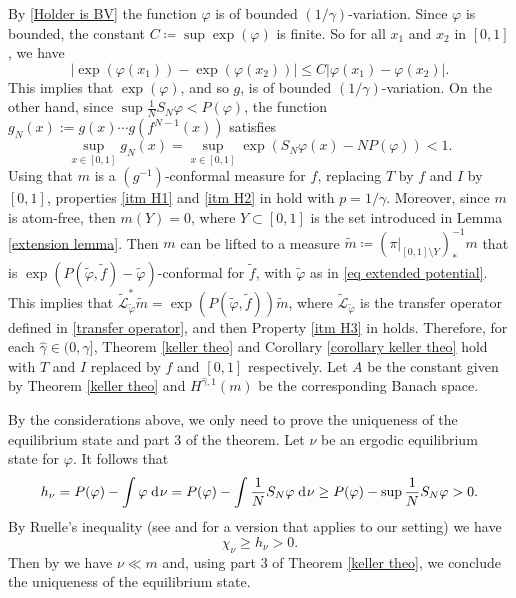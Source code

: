 \documentclass[12pt]{amsart}
\numberwithin{equation}{section} %
\numberwithin{figure}{section} %
\theoremstyle{plain}
\theoremstyle{definition}
\theoremstyle{remark}
\theoremstyle{citing}
\renewcommand{\=}{\coloneqq}
\newcommand{\dd}{\hspace{1pt}\operatorname{d}\hspace{-1pt}}
\begin{document}
By \eqref{Holder is BV} the function $\varphi$ is of bounded $(1/\gamma)$-variation. Since $\varphi$ is bounded, the constant $C\=\sup \exp(\varphi)$ is finite. So for all $x_1$ and $x_2$ in $[0,1]$, we have
\begin{equation*}
    |\exp(\varphi(x_1)) -\exp(\varphi(x_2))|\leq C|\varphi(x_1)-\varphi(x_2)|.
\end{equation*}
This implies that $\exp(\varphi)$, and so $g$, is of bounded $(1/\gamma)$-variation. On the other hand, since $\sup \frac{1}{N}S_N\varphi < P(\varphi)$, the function $g_N(x):=g(x)\cdots g(f^{N-1}(x))$ satisfies
\begin{equation*}
    \sup_{x\in [0,1]} g_N(x) = \sup_{x\in [0,1]}\exp(S_N\varphi(x) - NP(\varphi))<1.
\end{equation*}
Using that $m$ is a $(g^{-1})$-conformal measure for $f$, replacing $T$ by $f$ and $I$ by $[0,1]$, properties \ref{itm H1} and \ref{itm H2} in  hold with $p=1/\gamma$. Moreover, since $m$ is atom-free, then $m(Y)=0$, where $Y\subset[0,1]$ is the set introduced in Lemma \ref{extension lemma}. Then $m$ can be lifted to a measure $\widetilde{m}\=(\pi|_{[0,1]\setminus Y})^{-1}_*m$ that is $\exp(P(\widetilde\varphi,\widetilde{f}) - \widetilde{\varphi})$-conformal for $\widetilde{f}$, with $\widetilde{\varphi}$ as in \eqref{eq extended potential}. This implies that $\widetilde{\mathcal{L}}_{\widetilde{\varphi}}^*\widetilde{m} = \exp(P(\widetilde{\varphi},\widetilde{f}))\widetilde{m}$, where $\widetilde{\mathcal{L}}_{\widetilde{\varphi}}$ is the transfer operator defined in \eqref{transfer operator}, and then Property \ref{itm H3} in  holds. Therefore, for each $\widehat{\gamma} \in (0,\gamma]$, Theorem \ref{keller theo} and Corollary \ref{corollary keller theo} hold with $T$ and $I$ replaced by $f$ and $[0,1]$ respectively. Let $A$ be the constant given by Theorem \ref{keller theo} and $H^{\widehat{\gamma},1}(m)$ be the corresponding Banach space.

By the considerations above, we only need to prove the uniqueness of the equilibrium state and part 3 of the theorem. Let $\nu$ be an ergodic equilibrium state for $\varphi$. It follows that
\begin{equation*}
    h_{\nu} = P(\varphi) -\int \varphi \dd\nu = P(\varphi) - \int \frac{1}{N}S_N\varphi \dd \nu \geq P(\varphi) - \sup\frac{1}{N}S_N\varphi>0.
\end{equation*}
By Ruelle's inequality (see \cite[Theorem 2]{Hofbauer91} and \cite[Theorem 7.1]{BarrioJimenez} for a version that applies to our setting) we have
\begin{equation*}
    \chi_{\nu}\geq h_{\nu}>0.
\end{equation*}
Then by \cite[Theorem 6]{Dobbs} we have $\nu\ll m$ and, using part 3 of Theorem \ref{keller theo}, we conclude the uniqueness of the equilibrium state.
\end{document}
